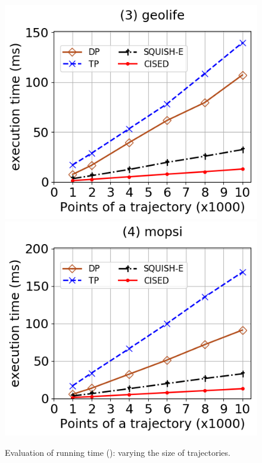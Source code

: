 \begin{figure}[tb!]
	\includegraphics[scale=0.315]{Figures/Exp-SED-time-size-geolife.png}	\hspace{1ex}
	\includegraphics[scale=0.315]{Figures/Exp-SED-time-size-mopsi.png}	\hspace{1ex}
	\vspace{-3ex}
	\caption{\small Evaluation of running time (\sed): varying the size of trajectories.}\label{fig:time-size-sed}
	\vspace{-2ex}
\end{figure}

